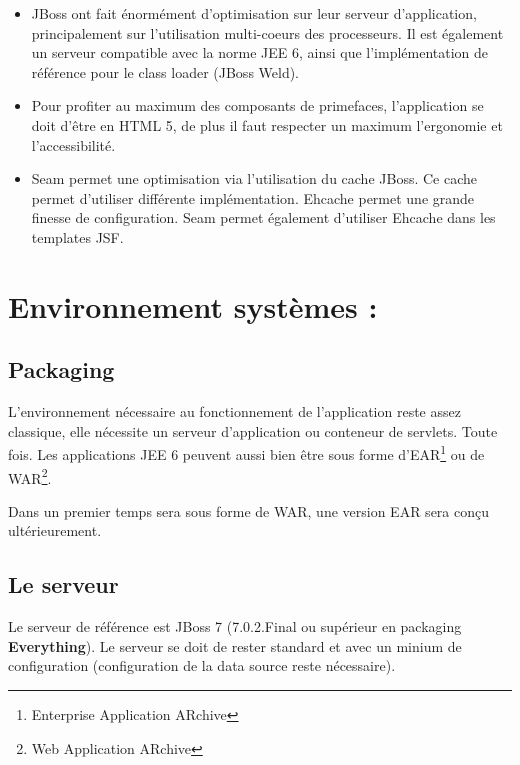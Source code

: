 \begin{itemize}
	\item {}
		JBoss ont fait énormément d'optimisation sur leur serveur d'application,  principalement
		sur l'utilisation multi-coeurs des processeurs. Il est également un serveur compatible avec la
		norme JEE 6, ainsi que l'implémentation de référence pour le class loader (JBoss Weld).
		\\

		
	\item {}
		Pour profiter au maximum des composants de primefaces, l'application se doit d'être en
		HTML 5, de plus il faut respecter un maximum l'ergonomie et l'accessibilité. 
		\\
						
	\item {}
		Seam permet une optimisation via l'utilisation du cache JBoss. Ce cache permet d'utiliser
		différente implémentation. Ehcache permet une grande finesse de configuration. Seam
		permet également d'utiliser Ehcache dans les templates JSF.
\end{itemize}



\section{Environnement systèmes :}

\subsection{Packaging}
L'environnement nécessaire au fonctionnement de l'application reste assez classique, 
elle nécessite un serveur d'application ou conteneur de servlets. Toute fois. Les applications
JEE 6 peuvent aussi bien être sous forme d'EAR\footnote{Enterprise Application ARchive}   ou de 
WAR\footnote{Web Application ARchive}.

Dans un premier temps \youTestIt{} sera sous forme de WAR, une version EAR sera conçu ultérieurement.


\subsection{Le serveur}
Le serveur de référence est JBoss 7 (7.0.2.Final ou supérieur en packaging \textbf{Everything}). 
Le serveur se doit de rester standard et avec un minium de configuration (configuration de la data
source reste nécessaire).

